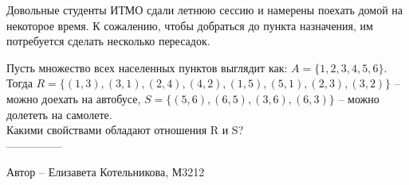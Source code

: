 \question
Довольные студенты ИТМО сдали летнюю сессию и намерены поехать домой на некоторое время. К сожалению, чтобы добраться до пункта назначения, им потребуется сделать несколько пересадок.

Пусть множество всех населенных пунктов выглядит как: $A = \{1, 2, 3, 4, 5, 6\}$.
\\
Тогда $R = \{(1, 3), (3, 1), (2, 4), (4, 2), (1, 5), (5, 1), (2, 3), (3, 2)\}$ -- можно доехать на автобусе, $S = \{(5, 6), (6, 5), (3, 6), (6, 3)\}$ -- можно долететь на самолете.
\\
Какими свойствами обладают отношения R и S?
\\
---------------

Автор -- Елизавета Котельникова, М3212